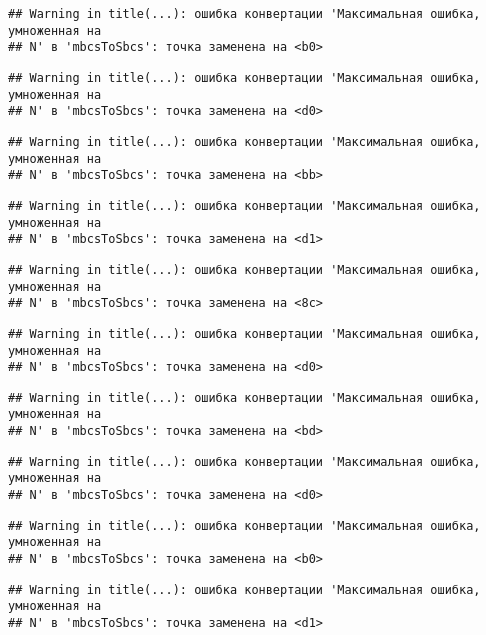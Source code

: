\documentclass[
]{article}
\begin{document}
\begin{verbatim}
## Warning in title(...): ошибка конвертации 'Максимальная ошибка, умноженная на
## N' в 'mbcsToSbcs': точка заменена на <b0>
\end{verbatim}

\begin{verbatim}
## Warning in title(...): ошибка конвертации 'Максимальная ошибка, умноженная на
## N' в 'mbcsToSbcs': точка заменена на <d0>
\end{verbatim}

\begin{verbatim}
## Warning in title(...): ошибка конвертации 'Максимальная ошибка, умноженная на
## N' в 'mbcsToSbcs': точка заменена на <bb>
\end{verbatim}

\begin{verbatim}
## Warning in title(...): ошибка конвертации 'Максимальная ошибка, умноженная на
## N' в 'mbcsToSbcs': точка заменена на <d1>
\end{verbatim}

\begin{verbatim}
## Warning in title(...): ошибка конвертации 'Максимальная ошибка, умноженная на
## N' в 'mbcsToSbcs': точка заменена на <8c>
\end{verbatim}

\begin{verbatim}
## Warning in title(...): ошибка конвертации 'Максимальная ошибка, умноженная на
## N' в 'mbcsToSbcs': точка заменена на <d0>
\end{verbatim}

\begin{verbatim}
## Warning in title(...): ошибка конвертации 'Максимальная ошибка, умноженная на
## N' в 'mbcsToSbcs': точка заменена на <bd>
\end{verbatim}

\begin{verbatim}
## Warning in title(...): ошибка конвертации 'Максимальная ошибка, умноженная на
## N' в 'mbcsToSbcs': точка заменена на <d0>
\end{verbatim}

\begin{verbatim}
## Warning in title(...): ошибка конвертации 'Максимальная ошибка, умноженная на
## N' в 'mbcsToSbcs': точка заменена на <b0>
\end{verbatim}

\begin{verbatim}
## Warning in title(...): ошибка конвертации 'Максимальная ошибка, умноженная на
## N' в 'mbcsToSbcs': точка заменена на <d1>
\end{verbatim}
\end{document}
